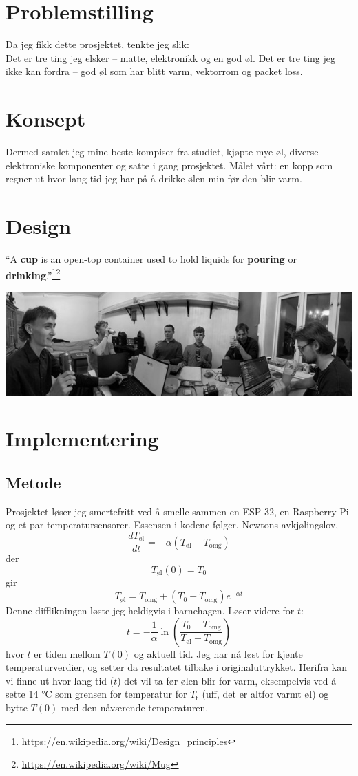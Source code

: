 \documentclass{article}
\begin{document}
\section{Problemstilling}
Da jeg fikk dette prosjektet, tenkte jeg slik:\\
Det er tre ting jeg elsker – matte, elektronikk og en god øl.  
Det er tre ting jeg ikke kan fordra – god øl som har blitt varm, vektorrom og packet loss.

\section{Konsept}
Dermed samlet jeg mine beste kompiser fra studiet, kjøpte mye øl, diverse elektroniske komponenter og satte i gang prosjektet.  
Målet vårt: en kopp som regner ut hvor lang tid jeg har på å drikke ølen min før den blir varm.

\section{Design}
``A \textbf{cup} is an open-top container used to hold liquids for \textbf{pouring} or \textbf{drinking}.''\footnote{\url{https://en.wikipedia.org/wiki/Design_principles}}\footnote{\url{https://en.wikipedia.org/wiki/Mug}}
\vfill
\begin{center}
    \includegraphics[width=\textwidth]{Panorama_pilsing.jpg}
\end{center}
\newpage
\section{Implementering}
\subsection{Metode}
Prosjektet løser jeg smertefritt ved å smelle sammen en ESP-32, en Raspberry Pi og et par temperatursensorer. Essensen i kodene følger.
Newtons avkjølingslov,
\[ 
\frac{dT_{\text{øl}}}{dt} = -\alpha(T_{\text{øl}} - T_{\text{omg}})
\]
der
\[ 
T_{\text{øl}}(0) = T_{0}
\]
gir
\[ 
T_{\text{øl}} = T_{\text{omg}} + (T_{0} - T_{\text{omg}})e^{-\alpha t}
\]
Denne difflikningen løste jeg heldigvis i barnehagen.
Løser videre for \(t\):
\[ 
t = -\frac{1}{\alpha} \ln \left(\frac{T_{0} - T_{\text{omg}}}{T_{\text{øl}} - T_{\text{omg}}}\right)
\]
hvor \(t\) er tiden mellom \(T(0)\) og aktuell tid. Jeg har nå løst for kjente temperaturverdier, og setter da resultatet tilbake i originaluttrykket. Herifra kan vi finne ut hvor lang tid (\(t\)) det vil ta før ølen blir for varm, eksempelvis ved å sette 14 °C som grensen for temperatur for \(T_{\text{t}}\) (uff, det er altfor varmt øl) og bytte \(T(0)\) med den nåværende temperaturen.\\
\end{document}
